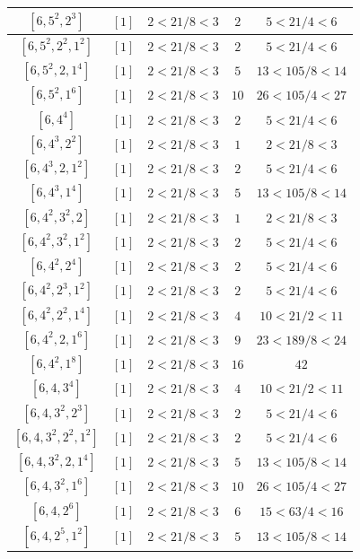 \documentclass{article}%
\begin{document}
\begin{center}
\begin{longtable}{||c|c|c|c|c||}
$[6, 5^{2}, 2^{3}]$ & $[1]$ & $2 < 21/8 < 3$ & $2$ & $5 < 21/4 < 6$ \\ \hline 
$[6, 5^{2}, 2^{2}, 1^{2}]$ & $[1]$ & $2 < 21/8 < 3$ & $2$ & $5 < 21/4 < 6$ \\ \hline 
$[6, 5^{2}, 2, 1^{4}]$ & $[1]$ & $2 < 21/8 < 3$ & $5$ & $13 < 105/8 < 14$ \\ \hline 
$[6, 5^{2}, 1^{6}]$ & $[1]$ & $2 < 21/8 < 3$ & $10$ & $26 < 105/4 < 27$ \\ \hline 
$[6, 4^{4}]$ & $[1]$ & $2 < 21/8 < 3$ & $2$ & $5 < 21/4 < 6$ \\ \hline 
$[6, 4^{3}, 2^{2}]$ & $[1]$ & $2 < 21/8 < 3$ & $1$ & $2 < 21/8 < 3$ \\ \hline 
$[6, 4^{3}, 2, 1^{2}]$ & $[1]$ & $2 < 21/8 < 3$ & $2$ & $5 < 21/4 < 6$ \\ \hline 
$[6, 4^{3}, 1^{4}]$ & $[1]$ & $2 < 21/8 < 3$ & $5$ & $13 < 105/8 < 14$ \\ \hline 
$[6, 4^{2}, 3^{2}, 2]$ & $[1]$ & $2 < 21/8 < 3$ & $1$ & $2 < 21/8 < 3$ \\ \hline 
$[6, 4^{2}, 3^{2}, 1^{2}]$ & $[1]$ & $2 < 21/8 < 3$ & $2$ & $5 < 21/4 < 6$ \\ \hline 
$[6, 4^{2}, 2^{4}]$ & $[1]$ & $2 < 21/8 < 3$ & $2$ & $5 < 21/4 < 6$ \\ \hline 
$[6, 4^{2}, 2^{3}, 1^{2}]$ & $[1]$ & $2 < 21/8 < 3$ & $2$ & $5 < 21/4 < 6$ \\ \hline 
$[6, 4^{2}, 2^{2}, 1^{4}]$ & $[1]$ & $2 < 21/8 < 3$ & $4$ & $10 < 21/2 < 11$ \\ \hline 
$[6, 4^{2}, 2, 1^{6}]$ & $[1]$ & $2 < 21/8 < 3$ & $9$ & $23 < 189/8 < 24$ \\ \hline 
$[6, 4^{2}, 1^{8}]$ & $[1]$ & $2 < 21/8 < 3$ & $16$ & $42$ \\ \hline 
$[6, 4, 3^{4}]$ & $[1]$ & $2 < 21/8 < 3$ & $4$ & $10 < 21/2 < 11$ \\ \hline 
$[6, 4, 3^{2}, 2^{3}]$ & $[1]$ & $2 < 21/8 < 3$ & $2$ & $5 < 21/4 < 6$ \\ \hline 
$[6, 4, 3^{2}, 2^{2}, 1^{2}]$ & $[1]$ & $2 < 21/8 < 3$ & $2$ & $5 < 21/4 < 6$ \\ \hline 
$[6, 4, 3^{2}, 2, 1^{4}]$ & $[1]$ & $2 < 21/8 < 3$ & $5$ & $13 < 105/8 < 14$ \\ \hline 
$[6, 4, 3^{2}, 1^{6}]$ & $[1]$ & $2 < 21/8 < 3$ & $10$ & $26 < 105/4 < 27$ \\ \hline 
$[6, 4, 2^{6}]$ & $[1]$ & $2 < 21/8 < 3$ & $6$ & $15 < 63/4 < 16$ \\ \hline 
$[6, 4, 2^{5}, 1^{2}]$ & $[1]$ & $2 < 21/8 < 3$ & $5$ & $13 < 105/8 < 14$ \\ \hline 

\end{longtable}
\end{center}
\end{document}
